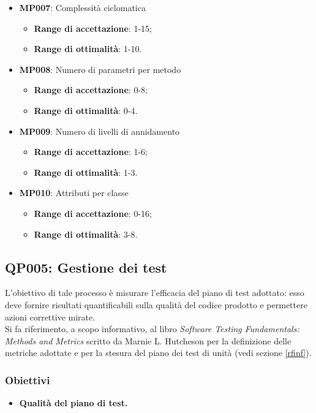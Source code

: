 \begin{itemize}
	\item \textbf{MP007}: Complessità ciclomatica
	\begin{itemize}
		\item \textbf{Range di accettazione}: 1-15;
		\item \textbf{Range di ottimalità}: 1-10.
	\end{itemize}
	\item \textbf{MP008}: Numero di parametri per metodo
	\begin{itemize}
		\item \textbf{Range di accettazione}: 0-8;
		\item \textbf{Range di ottimalità}: 0-4.
	\end{itemize}
	\item \textbf{MP009}: Numero di livelli di annidamento
	\begin{itemize}
		\item \textbf{Range di accettazione}: 1-6;
		\item \textbf{Range di ottimalità}: 1-3.
	\end{itemize}
	\item \textbf{MP010}: Attributi per classe
	\begin{itemize}
		\item \textbf{Range di accettazione}: 0-16;
		\item \textbf{Range di ottimalità}: 3-8.
	\end{itemize}
		
\end{itemize}

\subsection{QP005: Gestione dei test}\label{test}
L'obiettivo di tale processo è misurare l'efficacia del piano di test adottato: esso deve fornire risultati quantificabili sulla qualità del codice prodotto e permettere azioni correttive mirate.\\
Si fa riferimento, a scopo informativo, al libro \textit{Software Testing Fundamentals: Methods and Metrics} scritto da Marnie L. Hutcheson per la definizione delle metriche adottate e per la stesura del piano dei test di unità (vedi sezione \ref{rfinf}).
\subsubsection{Obiettivi}
\begin{itemize}
	\item \textbf{Qualità del piano di test.} 
\end{itemize}

